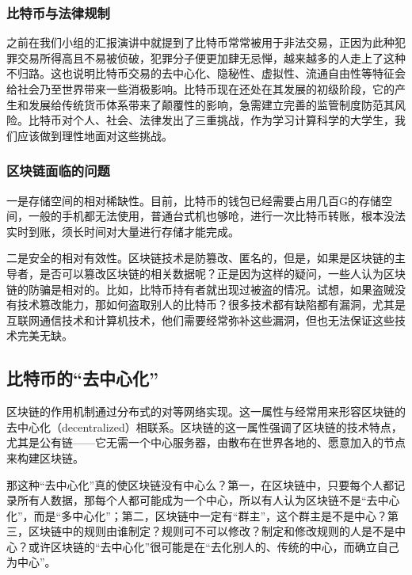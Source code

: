 \documentclass{article}
\begin{document}
\subsubsection{比特币与法律规制}
之前在我们小组的汇报演讲中就提到了比特币常常被用于非法交易，正因为此种犯罪交易所得高且不易被侦破，犯罪分子便更加肆无忌惮，越来越多的人走上了这种不归路。这也说明比特币交易的去中心化、隐秘性、虚拟性、流通自由性等特征会给社会乃至世界带来一些消极影响。比特币现在还处在其发展的初级阶段，它的产生和发展给传统货币体系带来了颠覆性的影响，急需建立完善的监管制度防范其风险。比特币对个人、社会、法律发出了三重挑战，作为学习计算科学的大学生，我们应该做到理性地面对这些挑战。\par
\subsubsection{区块链面临的问题}
一是存储空间的相对稀缺性。目前，比特币的钱包已经需要占用几百G的存储空间，一般的手机都无法使用，普通台式机也够呛，进行一次比特币转账，根本没法实时到账，须长时间对大量进行存储才能完成。\par
二是安全的相对有效性。区块链技术是防篡改、匿名的，但是，如果是区块链的主导者，是否可以篡改区块链的相关数据呢？正是因为这样的疑问，一些人认为区块链的防骗是相对的。比如，比特币持有者就出现过被盗的情况。试想，如果盗贼没有技术篡改能力，那如何盗取别人的比特币？很多技术都有缺陷都有漏洞，尤其是互联网通信技术和计算机技术，他们需要经常弥补这些漏洞，但也无法保证这些技术完美无缺\citep{huangqifan}。\par
\subsection{比特币的“去中心化”}
区块链的作用机制通过分布式的对等网络实现。这一属性与经常用来形容区块链的去中心化（decentralized）相联系。区块链的这一属性强调了区块链的技术特点，尤其是公有链——它无需一个中心服务器，由散布在世界各地的、愿意加入的节点来构建区块链。\par
那这种“去中心化”真的使区块链没有中心么？第一，在区块链中，只要每个人都记录所有人数据，那每个人都可能成为一个中心，所以有人认为区块链不是“去中心化”，而是“多中心化”；第二，区块链中一定有“群主”，这个群主是不是中心？第三，区块链中的规则由谁制定？规则可不可以修改？制定和修改规则的人是不是中心？或许区块链的“去中心化”很可能是在“去化别人的、传统的中心，而确立自己为中心”\citep{huangqifan}。\par
\end{document}
